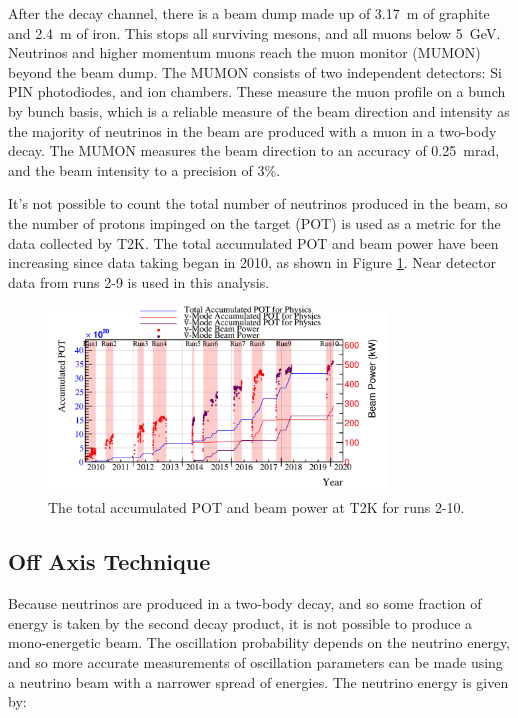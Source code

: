 After the decay channel, there is a beam dump made up of 3.17~m of graphite and 2.4~m of iron. This stops all surviving mesons, and all muons below 5~GeV. Neutrinos and higher momentum muons reach the muon monitor (MUMON) beyond the beam dump. The MUMON consists of two independent detectors: Si PIN photodiodes, and ion chambers. These measure the muon profile on a bunch by bunch basis, which is a reliable measure of the beam direction and intensity as the majority of neutrinos in the beam are produced with a muon in a two-body decay. The MUMON measures the beam direction to an accuracy of 0.25~mrad, and the beam intensity to a precision of 3$\%$\cite{mumon}.

It's not possible to count the total number of neutrinos produced in the beam, so the number of protons impinged on the target (POT) is used as a metric for the data collected by T2K. The total accumulated POT and beam power have been increasing since data taking began in 2010, as shown in Figure \ref{fig:pot}. Near detector data from runs 2-9 is used in this analysis.

\begin{figure}
\centering
\includegraphics*[width=0.8\textwidth,clip]{figs/pow_t2k_all_toRun84}
\caption{The total accumulated POT and beam power at T2K for runs 2-10.} \label{fig:pot}
\end{figure}

\subsection{Off Axis Technique}

Because neutrinos are produced in a two-body decay, and so some fraction of energy is taken by the second decay product, it is not possible to produce a mono-energetic beam. The oscillation probability depends on the neutrino energy, and so more accurate measurements of oscillation parameters can be made using a neutrino beam with a narrower spread of energies. The neutrino energy is given by\cite{Enuoffaxis}:

